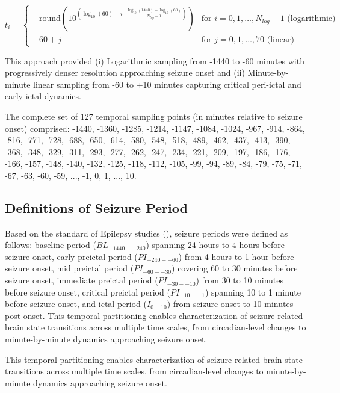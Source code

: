 \begin{equation}
t_i = \begin{cases}
-\text{round}(10^{(\log_{10}(60) + i \cdot \frac{\log_{10}(1440) - \log_{10}(60)}{N_{log}-1})}) & \text{for } i = 0, 1, \ldots, N_{log}-1 \text{ (logarithmic)} \\
-60 + j & \text{for } j = 0, 1, \ldots, 70 \text{ (linear)}
\end{cases}
\end{equation}

This approach provided (i) Logarithmic sampling from -1440 to -60 minutes with progressively denser resolution approaching seizure onset and (ii) Minute-by-minute linear sampling from -60 to +10 minutes capturing critical peri-ictal and early ictal dynamics.

The complete set of 127 temporal sampling points (in minutes relative to seizure onset) comprised: -1440, -1360, -1285, -1214, -1147, -1084, -1024, -967, -914, -864, -816, -771, -728, -688, -650, -614, -580, -548, -518, -489, -462, -437, -413, -390, -368, -348, -329, -311, -293, -277, -262, -247, -234, -221, -209, -197, -186, -176, -166, -157, -148, -140, -132, -125, -118, -112, -105, -99, -94, -89, -84, -79, -75, -71, -67, -63, -60, -59, ..., -1, 0, 1, ..., 10.


\subsection{Definitions of Seizure Period}

Based on the standard of Epilepsy studies (\cite{Kuhlmann2018}), seizure periods were defined as follows: baseline period ($BL_{-1440--240}$) spanning 24 hours to 4 hours before seizure onset, early preictal period ($PI_{-240--60}$) from 4 hours to 1 hour before seizure onset, mid preictal period ($PI_{-60--30}$) covering 60 to 30 minutes before seizure onset, immediate preictal period ($PI_{-30--10}$) from 30 to 10 minutes before seizure onset, critical preictal period ($PI_{-10--1}$) spanning 10 to 1 minute before seizure onset, and ictal period ($I_{0-10}$) from seizure onset to 10 minutes post-onset. This temporal partitioning enables characterization of seizure-related brain state transitions across multiple time scales, from circadian-level changes to minute-by-minute dynamics approaching seizure onset.

This temporal partitioning enables characterization of seizure-related brain state transitions across multiple time scales, from circadian-level changes to minute-by-minute dynamics approaching seizure onset.

